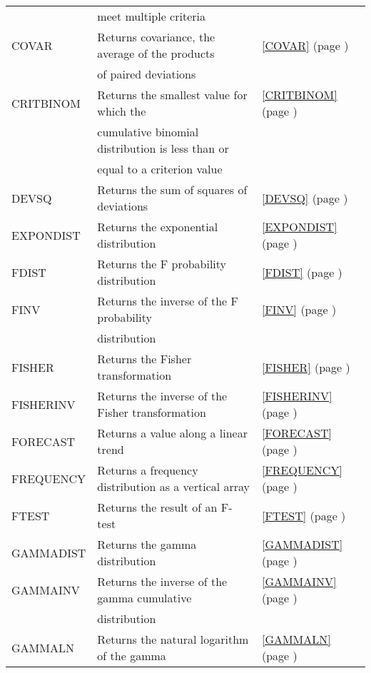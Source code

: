 \begin{center}
\begin{longtable}{l l l }
		& meet multiple criteria &   \\
		COVAR & Returns covariance, the average of the products &  \ref{COVAR} (page \pageref{COVAR}) \index{Spreadsheet Functions!COVAR} \\
		& of paired deviations &   \\
		CRITBINOM & Returns the smallest value for which the  &  \ref{CRITBINOM} (page \pageref{CRITBINOM}) \index{Spreadsheet Functions!CRITBINOM} \\
		& cumulative binomial distribution is less than or  &   \\
		& equal to a criterion value &   \\
		DEVSQ & Returns the sum of squares of deviations &  \ref{DEVSQ} (page \pageref{DEVSQ}) \index{Spreadsheet Functions!DEVSQ} \\
		EXPONDIST & Returns the exponential distribution &  \ref{EXPONDIST} (page \pageref{EXPONDIST}) \index{Spreadsheet Functions!EXPONDIST} \\
		FDIST & Returns the F probability distribution &  \ref{FDIST} (page \pageref{FDIST}) \index{Spreadsheet Functions!FDIST} \\
		FINV  & Returns the inverse of the F probability  &  \ref{FINV} (page \pageref{FINV}) \index{Spreadsheet Functions!FINV} \\
		& distribution &   \\
		FISHER & Returns the Fisher transformation &  \ref{FISHER} (page \pageref{FISHER}) \index{Spreadsheet Functions!FISHER} \\
		FISHERINV & Returns the inverse of the Fisher transformation &  \ref{FISHERINV} (page \pageref{FISHERINV}) \index{Spreadsheet Functions!FISHERINV} \\
		FORECAST & Returns a value along a linear trend &  \ref{FORECAST} (page \pageref{FORECAST}) \index{Spreadsheet Functions!FORECAST} \\
		FREQUENCY & Returns a frequency distribution as a vertical array &  \ref{FREQUENCY} (page \pageref{FREQUENCY}) \index{Spreadsheet Functions!FREQUENCY} \\
		FTEST & Returns the result of an F-test &  \ref{FTEST} (page \pageref{FTEST}) \index{Spreadsheet Functions!FTEST} \\
		GAMMADIST & Returns the gamma distribution &  \ref{GAMMADIST} (page \pageref{GAMMADIST}) \index{Spreadsheet Functions!GAMMADIST} \\
		GAMMAINV & Returns the inverse of the gamma cumulative  &  \ref{GAMMAINV} (page \pageref{GAMMAINV}) \index{Spreadsheet Functions!GAMMAINV} \\
		& distribution &   \\
		GAMMALN & Returns the natural logarithm of the gamma  &  \ref{GAMMALN} (page \pageref{GAMMALN}) \index{Spreadsheet Functions!GAMMALN} \\
		

\end{longtable}
\end{center}
